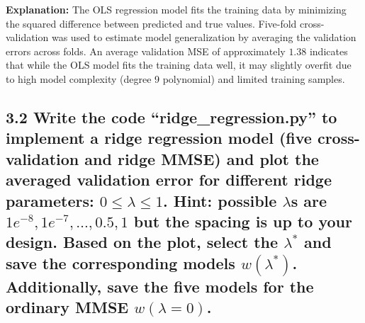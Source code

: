 \documentclass[12pt]{article}
\begin{document}
\textbf{Explanation:}  
The OLS regression model fits the training data by minimizing the squared difference between predicted and true values.  
Five-fold cross-validation was used to estimate model generalization by averaging the validation errors across folds.  
An average validation MSE of approximately $1.38$ indicates that while the OLS model fits the training data well, it may slightly overfit due to high model complexity (degree 9 polynomial) and limited training samples.

\subsection*{3.2
Write the code “ridge\_regression.py” to implement a ridge regression model (five cross-validation and ridge MMSE) and plot the averaged validation error for different ridge parameters: $0 \le \lambda \le 1$. Hint: possible $\lambda$s are $1e^{-8}, 1e^{-7}, \ldots, 0.5, 1$ but the spacing is up to your design. Based on the plot, select the $\lambda^*$ and save the corresponding models $w(\lambda^*)$. Additionally, save the five models for the ordinary MMSE $w(\lambda=0)$.}
\end{document}
